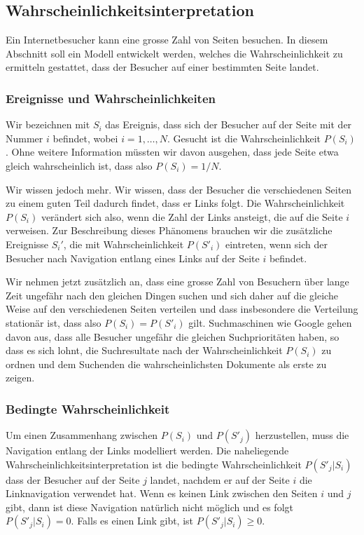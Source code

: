 %
%
\subsection{Wahrscheinlichkeitsinterpretation
\label{buch:subsection:wahrscheinlichkeitsinterpretation}}
Ein Internetbesucher kann eine grosse Zahl von Seiten besuchen.
In diesem Abschnitt soll ein Modell entwickelt werden, welches die
Wahrscheinlichkeit zu ermitteln gestattet, dass der Besucher auf
einer bestimmten Seite landet.

\subsubsection{Ereignisse und Wahrscheinlichkeiten}
Wir bezeichnen mit $S_i$ das Ereignis, dass sich der Besucher auf
der Seite mit der Nummer $i$ befindet, wobei $i=1,\dots,N$.
Gesucht ist die Wahrscheinlichkeit $P(S_i)$.
Ohne weitere Information müssten wir davon ausgehen, dass jede Seite
etwa gleich wahrscheinlich ist, dass also $P(S_i) = 1/N$.

Wir wissen jedoch mehr.
Wir wissen, dass der Besucher die verschiedenen Seiten zu einem guten 
Teil dadurch findet, dass er Links folgt.
Die Wahrscheinlichkeit $P(S_i)$ verändert sich also, wenn die Zahl der
Links ansteigt, die auf die Seite $i$ verweisen.
Zur Beschreibung dieses Phänomens brauchen wir die zusätzliche Ereignisse
$S_i'$, die mit Wahrscheinlichkeit $P(S'_i)$ eintreten, wenn sich der
Besucher nach Navigation entlang eines Links auf der Seite $i$ befindet.

Wir nehmen jetzt zusätzlich an, dass eine grosse Zahl von Besuchern über
lange Zeit ungefähr nach den gleichen Dingen suchen und sich daher
auf die gleiche Weise auf den verschiedenen Seiten verteilen und dass
insbesondere die Verteilung stationär ist, dass also $P(S_i) = P(S'_i)$
gilt.
Suchmaschinen wie Google gehen davon aus, dass alle Besucher ungefähr
die gleichen Suchprioritäten haben, so dass es sich lohnt, die Suchresultate
nach der Wahrscheinlichkeit $P(S_i)$ zu ordnen und dem Suchenden die
wahrscheinlichsten Dokumente als erste zu zeigen.

\subsubsection{Bedingte Wahrscheinlichkeit}
Um einen Zusammenhang zwischen $P(S_i)$ und $P(S'_j)$ herzustellen, muss
die Navigation entlang der Links modelliert werden.
Die naheliegende Wahrscheinlichkeitsinterpretation ist die bedingte
Wahrscheinlichkeit $P(S'_j|S_i)$ dass der Besucher auf der Seite $j$
landet, nachdem er auf der Seite $i$ die Linknavigation verwendet hat.
Wenn es keinen Link zwischen den Seiten $i$ und $j$ gibt, dann ist diese
Navigation natürlich nicht möglich und es folgt $P(S'_j|S_i)=0$.
Falls es einen Link gibt, ist $P(S'_j|S_i)\ge 0$.

